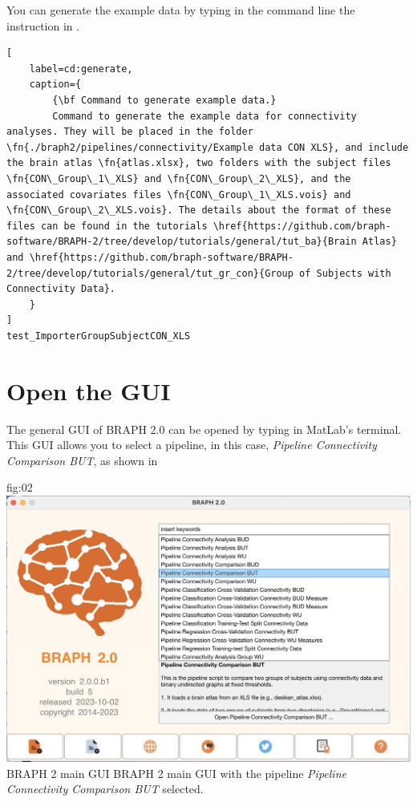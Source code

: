 \documentclass[justified]{tufte-handout}
\begin{document}
You can generate the example data by typing in the command line the instruction in .
%
\begin{lstlisting}[
	label=cd:generate,
	caption={
		{\bf Command to generate example data.}
		Command to generate the example data for connectivity analyses. They will be placed in the folder \fn{./braph2/pipelines/connectivity/Example data CON XLS}, and include the brain atlas \fn{atlas.xlsx}, two folders with the subject files \fn{CON\_Group\_1\_XLS} and \fn{CON\_Group\_2\_XLS}, and the associated covariates files \fn{CON\_Group\_1\_XLS.vois} and \fn{CON\_Group\_2\_XLS.vois}. The details about the format of these files can be found in the tutorials \href{https://github.com/braph-software/BRAPH-2/tree/develop/tutorials/general/tut_ba}{Brain Atlas} and \href{https://github.com/braph-software/BRAPH-2/tree/develop/tutorials/general/tut_gr_con}{Group of Subjects with Connectivity Data}.
	}
]
test_ImporterGroupSubjectCON_XLS
\end{lstlisting}

\section{Open the GUI}

The general GUI of BRAPH 2.0 can be opened by typing  in MatLab's terminal. This GUI allows you to select a pipeline, in this case, \emph{Pipeline Connectivity Comparison BUT}, as shown in 

	{fig:02}
	{
	\includegraphics{fig02.jpg}
	}
	{BRAPH 2 main GUI}
	{
	BRAPH 2 main GUI with the pipeline \emph{Pipeline Connectivity Comparison BUT} selected.
	}
\end{document}
